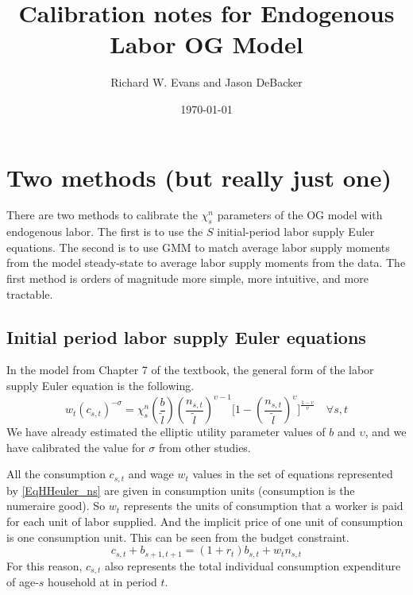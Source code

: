 \documentclass[letterpaper,12pt]{article}
\theoremstyle{definition}
\begin{document}
\title{Calibration notes for Endogenous Labor OG Model}
\date{\today}
\author{Richard W. Evans and Jason DeBacker}
\maketitle



\section{Two methods (but really just one)}

  There are two methods to calibrate the $\chi^n_s$ parameters of the OG model with endogenous labor. The first is to use the $S$ initial-period labor supply Euler equations. The second is to use GMM to match average labor supply moments from the model steady-state to average labor supply moments from the data. The first method is orders of magnitude more simple, more intuitive, and more tractable.


  \subsection{Initial period labor supply Euler equations}

    In the model from Chapter 7 of the textbook, the general form of the labor supply Euler equation is the following.
    \begin{equation}\label{EqHHeuler_ns}
      w_t\left(c_{s,t}\right)^{-\sigma} = \chi^n_s\left(\frac{b}{\tilde{l}}\right)\left(\frac{n_{s,t}}{\tilde{l}}\right)^{\upsilon-1}\Biggl[1 - \left(\frac{n_{s,t}}{\tilde{l}}\right)^\upsilon\Biggr]^{\frac{1-\upsilon}{\upsilon}} \quad\forall s, t
    \end{equation}
    We have already estimated the elliptic utility parameter values of $b$ and $\upsilon$, and we have calibrated the value for $\sigma$ from other studies.

    All the consumption $c_{s,t}$ and wage $w_t$ values in the set of equations represented by \eqref{EqHHeuler_ns} are given in consumption units (consumption is the numeraire good). So $w_t$ represents the units of consumption that a worker is paid for each unit of labor supplied. And the implicit price of one unit of consumption is one consumption unit. This can be seen from the budget constraint.
    \begin{equation}\label{EqHHbc}
      c_{s,t} + b_{s+1,t+1} = (1 + r_t)b_{s,t} + w_t n_{s,t}
    \end{equation}
    For this reason, $c_{s,t}$ also represents the total individual consumption expenditure of age-$s$ household at in period $t$.
\end{document}
